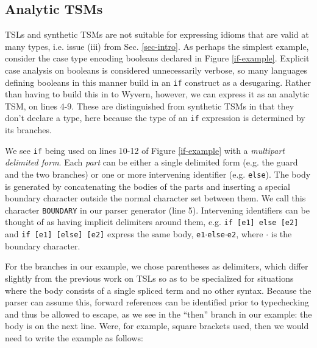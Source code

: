 \documentclass{sig-alternate}[10pt]
\newcommand{\lstinlinew}[1]{\lstinline[style=wyvern]{#1}}
\begin{document}



\subsection{Analytic TSMs}
TSLs and synthetic TSMs are not suitable for expressing idioms that are valid at many types, i.e. issue (iii) from Sec. \ref{sec-intro}. As perhaps the simplest example, consider the case type encoding booleans declared in Figure \ref{if-example}. Explicit case analysis on booleans is considered unnecessarily verbose, so many languages defining booleans in this manner build in an \lstinlinew{if} construct as a desugaring. Rather than having to build this in to Wyvern, however, we can express it as an analytic TSM, on lines 4-9. These are distinguished from synthetic TSMs in that they don't declare a type, here because the type of an \lstinlinew{if} expression is determined by its branches. 

We see \lstinlinew{if} being used on lines 10-12 of Figure \ref{if-example} with a \emph{multipart delimited form}. Each \emph{part} can be either a single delimited form (e.g. the guard and the two branches) or one or more intervening identifier (e.g. \lstinlinew{else}). The body is generated by concatenating the bodies of the parts and inserting a special boundary character outside the normal character set between them. We call this character \lstinlinew{BOUNDARY} in our parser generator (line 5). Intervening identifiers can be thought of as having implicit delimiters around them, e.g. \lstinlinew{if [e1] else [e2]} and \lstinlinew{if [e1] [else] [e2]} express the same body, \texttt{e1}$\cdot$\lstinlinew{else}$\cdot$\lstinlinew{e2}, where $\cdot$ is the boundary character.

For the branches in our example, we chose parentheses as delimiters, which  differ slightly from the previous work on TSLs so as to be specialized for situations where the body consists of a single spliced term and no other syntax. Because the parser can assume this, forward references can be identified prior to typechecking and thus be allowed to escape, as we see in the ``then'' branch in our example: the body is on the next line. Were, for example, square brackets used, then we would need to write the example as follows:
\end{document}
